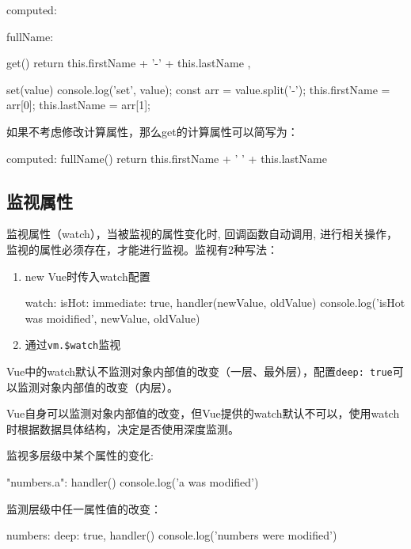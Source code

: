 \begin{js}
computed: {
    fullName: {
        get() {
            return this.firstName + '-' + this.lastName
        },

        set(value) {
            console.log('set', value);
            const arr = value.split('-');
            this.firstName = arr[0];
            this.lastName = arr[1];
        }
    }
}
\end{js}

如果不考虑修改计算属性，那么get的计算属性可以简写为：
\begin{js}
computed: {
    fullName() {
        return this.firstName + ' ' + this.lastName
    }
}
\end{js}
\subsection{监视属性}
监视属性（watch），当被监视的属性变化时, 回调函数自动调用, 进行相关操作，监视的属性必须存在，才能进行监视。监视有2种写法：
\begin{enumerate}
    \item new Vue时传入watch配置
    \begin{js}
watch: {
    isHot: {
        immediate: true,
        handler(newValue, oldValue) {
            console.log('isHot was moidified', newValue, oldValue)
        }
    }
}
    \end{js}
    \item 通过\verb|vm.$watch|监视
\end{enumerate}

Vue中的watch默认不监测对象内部值的改变（一层、最外层），配置\verb|deep: true|可以监测对象内部值的改变（内层）。

Vue自身可以监测对象内部值的改变，但Vue提供的watch默认不可以，使用watch时根据数据具体结构，决定是否使用深度监测。

监视多层级中某个属性的变化:
\begin{js}
"numbers.a": {
    handler() {
        console.log('a was modified')
    }
}
\end{js}

监测层级中任一属性值的改变：
\begin{js}
numbers: {
    deep: true,
    handler() {
        console.log('numbers were modified')
    }
}
\end{js}